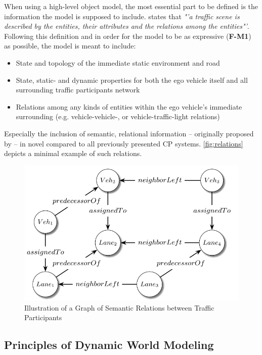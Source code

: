 When using a high-level object model, the most essential part to be defined is the information the model is supposed to include. \cite{Petrich2018} states that \textit{"'a traffic scene is described by the entities, their attributes and the relations among the entities"'}. Following this definition and in order for the model to be as expressive (\textbf{F-M1}) as possible, the model is meant to include:

\begin{itemize}
	\item State and topology of the immediate static environment and road
	\item State, static- and dynamic properties for both the ego vehicle itself and all surrounding traffic participants
	 network
	\item Relations among any kinds of entities within the ego vehicle's immediate surrounding (e.g. vehicle-vehicle-, or vehicle-traffic-light relations)
\end{itemize}

Especially the inclusion of semantic, relational information – originally proposed by \cite{Kohlhaas2014} – in novel compared to all previously presented CP systems. \autoref{fig:relations} depicts a minimal example of such relations. 

\begin{figure}
	\centering
	\includegraphics[width=0.5\linewidth]{98_images/relations}
	\caption[Semantic Relations between Traffic Participants]{Illustration of a Graph of Semantic Relations between Traffic Participants \cite{Petrich2018}}
	\label{fig:relations}
\end{figure}

\subsection{Principles of Dynamic World Modeling}
\label{subsec:concept_design:principle_of_dynamic_world_modeling}

